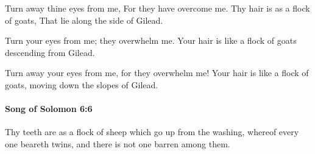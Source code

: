 			\begin{versebox}
					\item[BHS] 
					\item[LXX] 
					\item[ASV] Turn away thine eyes from me, For they have overcome me. Thy hair is as a flock of goats, That lie along the side of Gilead.
					\item[NIV] Turn your eyes from me; they overwhelm me. Your hair is like a flock of goats descending from Gilead.
					\item[NRSV] Turn away your eyes from me, for they overwhelm me! Your hair is like a flock of goats, moving down the slopes of Gilead.
			\end{versebox}

		\paragraph{Song of Solomon 6:6} %
			\label{SONGOFSOLOMON-6-6}

			Thy teeth are as a flock of sheep which go up from the washing, whereof every one beareth twins, and there is not one barren among them.

